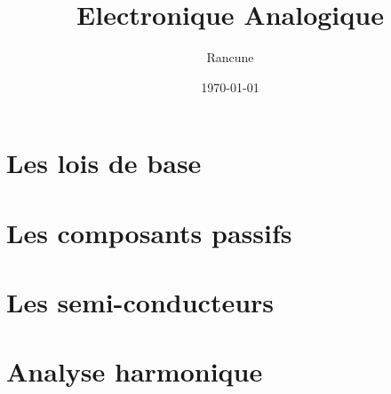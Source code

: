 \documentclass[a4paper,12pt]{book}
\title{Electronique Analogique}
\author{Rancune}
\date{\today}
\begin{document}
\maketitle

\frontmatter

\tableofcontents    



\mainmatter

\part{ Les lois de base }


%
%
%
%

\part{ Les composants passifs }

%
%
%

\part{ Les semi-conducteurs }

%
%
%

\part{ Analyse harmonique }


\appendix

\backmatter

\printindex

\end{document}
